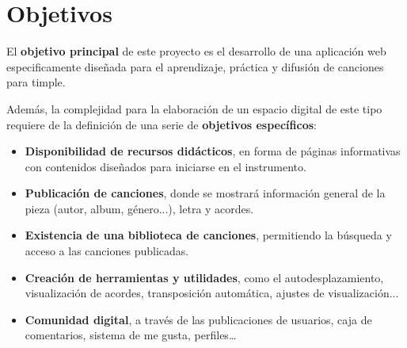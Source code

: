 \section{Objetivos}

El \textbf{objetivo principal} de este proyecto es el desarrollo de una aplicación web especificamente diseñada para el aprendizaje, práctica y difusión de canciones para timple.

Además, la complejidad para la elaboración de un espacio digital de este tipo requiere de la definición de una serie de \textbf{objetivos específicos}:

\begin{itemize}
    \item \textbf{Disponibilidad de recursos didácticos}, en forma de páginas informativas con contenidos diseñados para iniciarse en el instrumento.
    \item \textbf{Publicación de canciones}, donde se mostrará información general de la pieza (autor, album, género...), letra y acordes.
    \item \textbf{Existencia de una biblioteca de canciones}, permitiendo la búsqueda y acceso a las canciones publicadas.
    \item \textbf{Creación de herramientas y utilidades}, como el autodesplazamiento, visualización de acordes, transposición automática, ajustes de visualización...
    \item \textbf{Comunidad digital}, a través de las publicaciones de usuarios, caja de comentarios, sistema de me gusta, perfiles…
\end{itemize}
